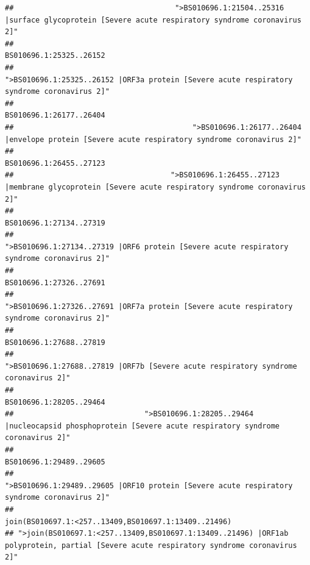 \documentclass[
]{article}
\begin{document}
\begin{verbatim}
##                                     ">BS010696.1:21504..25316 |surface glycoprotein [Severe acute respiratory syndrome coronavirus 2]" 
##                                                                                                                BS010696.1:25325..26152 
##                                            ">BS010696.1:25325..26152 |ORF3a protein [Severe acute respiratory syndrome coronavirus 2]" 
##                                                                                                                BS010696.1:26177..26404 
##                                         ">BS010696.1:26177..26404 |envelope protein [Severe acute respiratory syndrome coronavirus 2]" 
##                                                                                                                BS010696.1:26455..27123 
##                                    ">BS010696.1:26455..27123 |membrane glycoprotein [Severe acute respiratory syndrome coronavirus 2]" 
##                                                                                                                BS010696.1:27134..27319 
##                                             ">BS010696.1:27134..27319 |ORF6 protein [Severe acute respiratory syndrome coronavirus 2]" 
##                                                                                                                BS010696.1:27326..27691 
##                                            ">BS010696.1:27326..27691 |ORF7a protein [Severe acute respiratory syndrome coronavirus 2]" 
##                                                                                                                BS010696.1:27688..27819 
##                                                    ">BS010696.1:27688..27819 |ORF7b [Severe acute respiratory syndrome coronavirus 2]" 
##                                                                                                                BS010696.1:28205..29464 
##                              ">BS010696.1:28205..29464 |nucleocapsid phosphoprotein [Severe acute respiratory syndrome coronavirus 2]" 
##                                                                                                                BS010696.1:29489..29605 
##                                            ">BS010696.1:29489..29605 |ORF10 protein [Severe acute respiratory syndrome coronavirus 2]" 
##                                                                                   join(BS010697.1:<257..13409,BS010697.1:13409..21496) 
## ">join(BS010697.1:<257..13409,BS010697.1:13409..21496) |ORF1ab polyprotein, partial [Severe acute respiratory syndrome coronavirus 2]" 

\end{verbatim}
\end{document}
